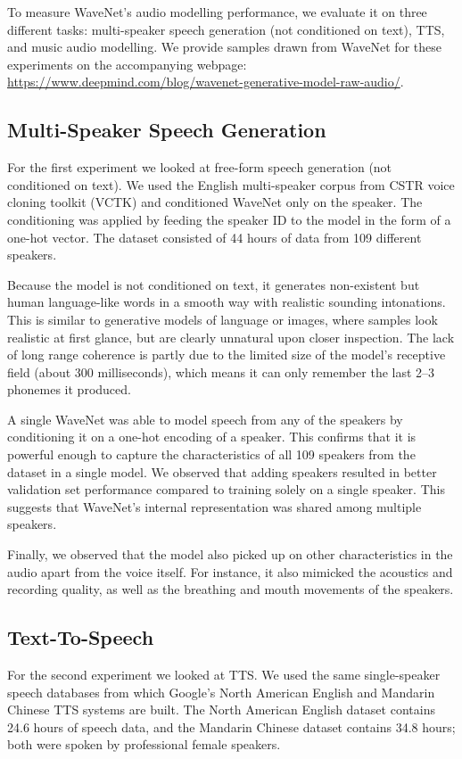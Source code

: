 To measure WaveNet's audio modelling performance, we evaluate it on three different tasks: multi-speaker speech generation (not conditioned on text), TTS, and music audio modelling. We provide samples drawn from WaveNet for these experiments on the accompanying webpage:\\ \url{https://www.deepmind.com/blog/wavenet-generative-model-raw-audio/}.

\subsection{Multi-Speaker Speech Generation}

For the first experiment we looked at free-form speech generation (not conditioned on text). We used the English multi-speaker corpus from CSTR voice cloning toolkit (VCTK) \citep{VCTK} and conditioned WaveNet only on the speaker. The conditioning was applied by feeding the speaker ID to the model in the form of a one-hot vector. The dataset consisted of 44 hours of data from 109 different speakers.

Because the model is not conditioned on text, it generates non-existent but human language-like words in a smooth way with realistic sounding intonations. This is similar to generative models of language or images, where samples look realistic at first glance, but are clearly unnatural upon closer inspection. The lack of long range coherence is partly due to the limited size of the model's receptive field (about 300 milliseconds), which means it can only remember the last 2--3 phonemes it produced.

A single WaveNet was able to model speech from any of the speakers by conditioning it on a one-hot encoding of a speaker. This confirms that it is powerful enough to capture the characteristics of all 109 speakers from the dataset in a single model. We observed that adding speakers resulted in better validation set performance compared to training solely on a single speaker. This suggests that WaveNet's internal representation was shared among multiple speakers.

Finally, we observed that the model also picked up on other characteristics in the audio apart from the voice itself. For instance, it also mimicked the acoustics and recording quality, as well as the breathing and mouth movements of the speakers.

\subsection{Text-To-Speech}
For the second experiment we looked at TTS.  
We used the same single-speaker speech databases from which Google's North American English and Mandarin Chinese TTS systems are built.
The North American English dataset contains 24.6 hours of speech data, and the Mandarin Chinese dataset contains 34.8 hours; both were spoken by professional female speakers.

